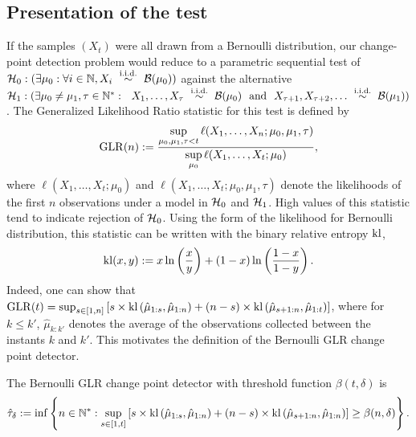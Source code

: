 \subsection{Presentation of the test}

If the samples $(X_t)$ were all drawn from a Bernoulli distribution, our change-point detection problem would reduce to a parametric sequential test of
$\cH_0 : (\exists \mu_0: \forall i\in\N, X_i \ \overset{\text{i.i.d.}}{\sim} \ \cB(\mu_0))$
against the alternative
$\cH_1 : (\exists \mu_0 \neq \mu_1, \tau \in \N^*: \ \  X_1, \ldots, X_\tau \ \overset{\text{i.i.d.}}{\sim} \ \cB(\mu_0) \ \ \text{and} \ \ X_{\tau+1}, X_{\tau+2}, \ldots \ \overset{\text{i.i.d.}}{\sim} \ \cB(\mu_1))$.
The Generalized Likelihood Ratio statistic for this test is defined by
\[\mathrm{GLR}(n) :=\frac{\sup\limits_{\mu_0,\mu_1,\tau < t}\ell(X_1, \ldots, X_n ; \mu_0,\mu_1,\tau)}{\sup\limits_{\mu_0}\ell(X_1, \ldots, X_t ; \mu_0)},\]
%
where $\ell(X_1, \ldots, X_t ; \mu_0)$ and $\ell(X_1, \ldots, X_t ; \mu_0,\mu_1,\tau)$ denote the likelihoods of the first $n$ observations under a model in $\mathcal{H}_0$ and $\mathcal{H}_1$.
High values of this statistic tend to indicate rejection of $\mathcal{H}_0$.
Using the form of the likelihood for Bernoulli distribution, this statistic can be written with the binary relative entropy $\mathrm{kl}$,
%
\begin{equation}\label{eq:6:BernoulliDivergence}
    \mathrm{kl}(x,y) := x \ln\left(\frac{x}{y}\right) + (1-x)\ln\left(\frac{1-x}{1-y}\right).
\end{equation}
%
Indeed, one can show that $\mathrm{GLR}(t) = \sup_{s \in [1,n]} \left[s \times \mathrm{kl}\left(\hat{\mu}_{1:s},\hat{\mu}_{1:n}\right) + (n-s) \times \mathrm{kl}\left(\hat{\mu}_{s+1:n},\hat{\mu}_{1:t}\right)\right]$,
where for $k \leq k'$, $\hat{\mu}_{k:k'}$ denotes the average of the observations collected between the instants $k$ and $k'$. This motivates the definition of the Bernoulli GLR change point detector.

\begin{definition}\label{def:6:GLRDef}
    The Bernoulli GLR change point detector with threshold function $\beta(t,\delta)$ is
    \begin{equation}\label{def:6:GLR}
        \hat\tau_{\delta} := \inf \left\{ n \in \mathbb{N}^* : \sup_{s \in [1,t]} \left[s \times \mathrm{kl}\left(\hat{\mu}_{1:s},\hat{\mu}_{1:n}\right) + (n-s) \times \mathrm{kl}\left(\hat{\mu}_{s+1:n},\hat{\mu}_{1:n}\right)\right] \geq \beta(n,\delta)\right\}.
    \end{equation}
\end{definition}

